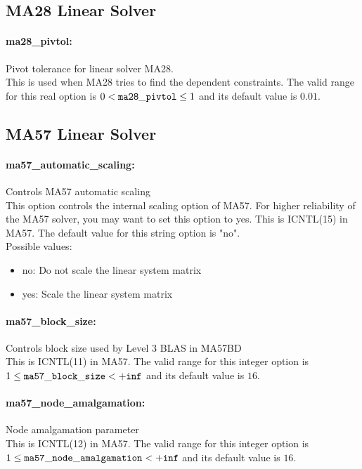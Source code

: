 \subsection{MA28 Linear Solver}
\label{sec:MA28LinearSolver}
\paragraph{ma28\_pivtol:}\label{opt:ma28_pivtol} Pivot tolerance for linear solver MA28. \\
 This is used when MA28 tries to find the dependent constraints. The valid range for this real option is 
$0 <  {\tt ma28\_pivtol } \le 1$
and its default value is $0.01$.


\subsection{MA57 Linear Solver}
\label{sec:MA57LinearSolver}
\paragraph{ma57\_automatic\_scaling:}\label{opt:ma57_automatic_scaling} Controls MA57 automatic scaling \\
 This option controls the internal scaling option of MA57. For higher reliability of the MA57 solver, you may want to set this option to yes. This is ICNTL(15) in MA57. The default value for this string option is "no".
\\ 
Possible values:
\begin{itemize}
   \item no: Do not scale the linear system matrix
   \item yes: Scale the linear system matrix
\end{itemize}

\paragraph{ma57\_block\_size:}\label{opt:ma57_block_size} Controls block size used by Level 3 BLAS in MA57BD \\
 This is ICNTL(11) in MA57. The valid range for this integer option is
$1 \le {\tt ma57\_block\_size } <  {\tt +inf}$
and its default value is $16$.


\paragraph{ma57\_node\_amalgamation:}\label{opt:ma57_node_amalgamation} Node amalgamation parameter \\
 This is ICNTL(12) in MA57. The valid range for this integer option is
$1 \le {\tt ma57\_node\_amalgamation } <  {\tt +inf}$
and its default value is $16$.


